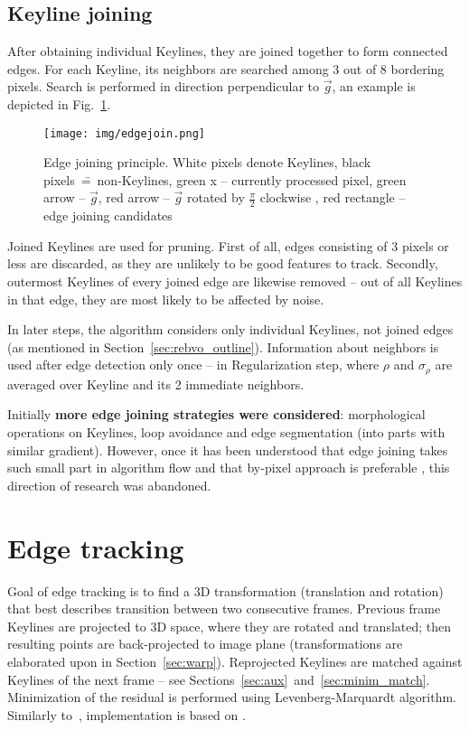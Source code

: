 \subsection{Keyline joining}

After obtaining individual Keylines, they are joined together to form connected edges.
For each Keyline, its neighbors are searched among 3 out of 8 bordering pixels. Search is performed in direction perpendicular to $\vec{g}$, an example is depicted in Fig.~\ref{fig:edgejoin}.

\begin{figure}[ht]
	\centering\texttt{[image: img/edgejoin.png]}
	\caption{ Edge joining principle. White pixels denote Keylines, black pixels~\==~non-Keylines, green x -- currently processed pixel, green arrow -- $\vec{g}$, red arrow -- $\vec{g}$ rotated by $\frac{\pi}{2}$ clockwise , red rectangle -- edge joining candidates }
	\label{fig:edgejoin}
\end{figure}


Joined Keylines are used for pruning. First of all, edges consisting of 3 pixels or less are discarded, as they are unlikely to be good features to track. Secondly, outermost Keylines of every joined edge are likewise removed -- out of all Keylines in that edge, they are most likely to be affected by noise.

In later steps, the algorithm considers only individual Keylines, not joined edges (as mentioned in Section~\ref{sec:rebvo_outline}). Information about neighbors is used after edge detection only once -- in Regularization step, where $\rho$ and $\sigma_{\rho}$
are averaged over Keyline and its 2 immediate neighbors.

Initially \textbf{more edge joining strategies were considered}: morphological operations on Keylines, loop avoidance and edge segmentation (into parts with similar gradient). However, once it has been understood that edge joining takes such small part in algorithm flow and that by-pixel approach is preferable \cite{harris}, this direction of research was abandoned.



\section{Edge tracking}

Goal of edge tracking is to find a 3D transformation (translation and rotation) that best describes transition between two consecutive frames. Previous frame Keylines are projected to 3D space, where they are rotated and translated; then resulting points are back-projected to image plane (transformations are elaborated upon in Section~\ref{sec:warp}). Reprojected Keylines are matched against Keylines of the next frame -- see Sections~\ref{sec:aux}~and~\ref{sec:minim_match}. Minimization of the residual is performed using Levenberg-Marquardt algorithm. Similarly to~\cite{jose2015realtime}, implementation is based on \cite{madsen2004methods}.


